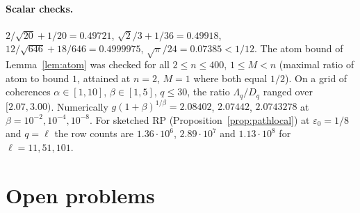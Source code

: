 \documentclass[11pt,a4paper]{article}
\theoremstyle{definition}
\theoremstyle{remark}
\numberwithin{equation}{section}
\newcommand{\eps}{\varepsilon}
\begin{document}
\paragraph{Scalar checks.} $2/\sqrt{20}+1/20=0.49721$, $\sqrt2/3+1/36=0.49918$,
$12/\sqrt{646}+18/646=0.4999975$, $\sqrt\pi/24=0.07385<1/12$. The atom bound of
Lemma~\ref{lem:atom} was checked for all $2\le n\le400$, $1\le M<n$ (maximal
ratio of atom to bound $1$, attained at $n=2$, $M=1$ where both equal $1/2$).
On a grid of coherences $\alpha\in[1,10]$, $\beta\in[1,5]$, $q\le30$, the ratio
$\Lambda_q/D_q$ ranged over $[2.07,3.00)$. Numerically
$g(1+\beta)^{1/\beta}=2.08402$, $2.07442$, $2.0743278$ at $\beta=10^{-2},10^{-4},10^{-8}$.
For sketched RP (Proposition~\ref{prop:pathlocal}) at $\eps_0=1/8$ and $q=\ell$ the
row counts are $1.36\cdot10^6$, $2.89\cdot10^7$ and $1.13\cdot10^8$ for
$\ell=11,51,101$.

\FloatBarrier
\section{Open problems}\label{sec:open}
\end{document}
